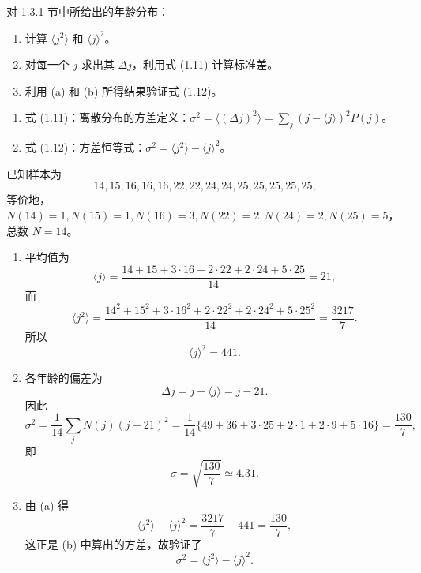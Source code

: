 \begin{question}
对 1.3.1 节中所给出的年龄分布：
\begin{enumerate}
\item 计算 $\langle j^2\rangle$ 和 $\langle j\rangle^2$。
\item 对每一个 $j$ 求出其 $\Delta j$，利用式 (1.11) 计算标准差。
\item 利用 (a) 和 (b) 所得结果验证式 (1.12)。
\end{enumerate}

\par\smallskip
{}
\begin{enumerate}[leftmargin=2.2em,itemsep=0.12em,topsep=0.12em,parsep=0pt]
\item 式 (1.11)：离散分布的方差定义：$\sigma^2=\langle(\Delta j)^2\rangle=\sum_j (j-\langle j\rangle)^2P(j)$。
\item 式 (1.12)：方差恒等式：$\sigma^2=\langle j^2\rangle-\langle j\rangle^2$。
\end{enumerate}

\end{question}
\begin{solution}
已知样本为
\[
14,15,16,16,16,22,22,24,24,25,25,25,25,25,
\]
等价地，$N(14)=1,N(15)=1,N(16)=3,N(22)=2,N(24)=2,N(25)=5$，总数 $N=14$。
\begin{enumerate}
\item 平均值为
\[
\langle j\rangle=\frac{14+15+3\cdot 16+2\cdot 22+2\cdot 24+5\cdot 25}{14}=21,
\]
而
\[
\langle j^2\rangle=\frac{14^2+15^2+3\cdot 16^2+2\cdot 22^2+2\cdot 24^2+5\cdot 25^2}{14}
=\frac{3217}{7}.
\]
所以
\[
\langle j\rangle^2=441.
\]
\item 各年龄的偏差为
\[
\Delta j=j-\langle j\rangle=j-21.
\]
因此
\[
\sigma^2=\frac{1}{14}\sum_j N(j)(j-21)^2
=\frac{1}{14}\{49+36+3\cdot25+2\cdot1+2\cdot9+5\cdot16\}
=\frac{130}{7},
\]
即
\[
\sigma=\sqrt{\frac{130}{7}}\simeq 4.31.
\]
\item 由 (a) 得
\[
\langle j^2\rangle-\langle j\rangle^2=\frac{3217}{7}-441=\frac{130}{7},
\]
这正是 (b) 中算出的方差，故验证了
\[
\sigma^2=\langle j^2\rangle-\langle j\rangle^2.
\]
\end{enumerate}
\end{solution}

